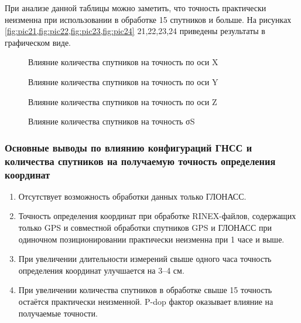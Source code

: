 При анализе данной таблицы можно заметить, что точность практически неизменна при использовании в обработке 15 спутников и больше. На рисунках \cref{fig:pic21,fig:pic22,fig:pic23,fig:pic24} 21,22,23,24 приведены результаты в графическом виде.


\begin{figure}[h]
	\centerfloat{
		
	}
	\caption{Влияние количества спутников на точность по оси X}\label{fig:pic21}
\end{figure}

\begin{figure}[h]
	\centerfloat{
		
	}
	\caption{Влияние количества спутников на точность по оси Y}\label{fig:pic22}
\end{figure}

\begin{figure}[h]
	\centerfloat{
		
	}
	\caption{Влияние количества спутников на точность по оси Z}\label{fig:pic23}
\end{figure}

\begin{figure}[h]
	\centerfloat{
		
	}
	\caption{Влияние количества спутников на точность σS}\label{fig:pic24}
\end{figure}


\subsubsection{Основные выводы по влиянию конфигураций ГНСС и количества спутников на получаемую точность определения координат }\label{subsec:ch2/sec3/sub3/sub1}

\begin{enumerate}
	\item Отсутствует возможность обработки данных только ГЛОНАСС.
	\item Точность определения координат при обработке RINEX-файлов, содержащих только GPS и совместной обработки спутников GPS и ГЛОНАСС при одиночном позиционировании практически неизменна при 1 часе и выше.
	\item При увеличении длительности измерений свыше одного часа точность определения координат улучшается на 3--4 см.
	\item При увеличении количества спутников в обработке свыше 15 точность остаётся практически неизменной. P-dop фактор оказывает влияние на получаемые точности. 
\end{enumerate}



